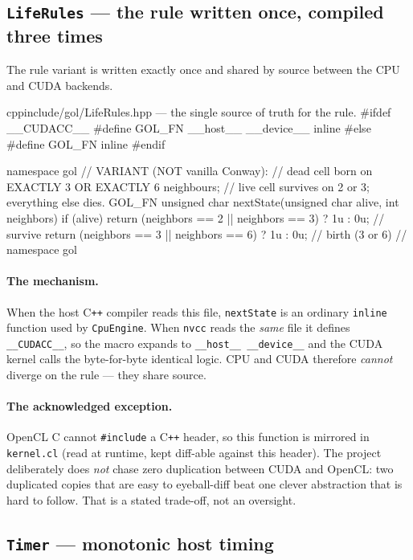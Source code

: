 \documentclass[
	english,
	letterpaper, oneside
]{article}
\begin{document}
\subsection{\texttt{LifeRules} --- the rule written once, compiled three times}
\label{sec:liferules}

The rule variant is written exactly once and shared by source between the CPU
and CUDA backends.

\begin{sourcecode}{cpp}{include/gol/LifeRules.hpp --- the single source of truth for the rule.}
#ifdef __CUDACC__
#define GOL_FN __host__ __device__ inline
#else
#define GOL_FN inline
#endif

namespace gol {
// VARIANT (NOT vanilla Conway):
//   dead cell born on EXACTLY 3 OR EXACTLY 6 neighbours;
//   live cell survives on 2 or 3; everything else dies.
GOL_FN unsigned char nextState(unsigned char alive, int neighbors) {
  if (alive) {
    return (neighbors == 2 || neighbors == 3) ? 1u : 0u; // survive
  }
  return (neighbors == 3 || neighbors == 6) ? 1u : 0u;   // birth (3 or 6)
}
} // namespace gol
\end{sourcecode}

\paragraph{The mechanism.} When the host C\texttt{++} compiler reads this file,
\texttt{nextState} is an ordinary \texttt{inline} function used by
\texttt{CpuEngine}. When \texttt{nvcc} reads the \emph{same} file it defines
\texttt{\_\_CUDACC\_\_}, so the macro expands to \texttt{\_\_host\_\_
\_\_device\_\_} and the CUDA kernel calls the byte-for-byte identical logic. CPU
and CUDA therefore \emph{cannot} diverge on the rule --- they share source.

\paragraph{The acknowledged exception.} OpenCL C cannot \texttt{\#include} a
C\texttt{++} header, so this function is mirrored in \texttt{kernel.cl}
(read at runtime, kept diff-able against this header). The project deliberately
does \emph{not} chase zero duplication between CUDA and OpenCL: two duplicated
copies that are easy to eyeball-diff beat one clever abstraction that is hard to
follow. That is a stated trade-off, not an oversight.

\subsection{\texttt{Timer} --- monotonic host timing}
\label{sec:timer}
\end{document}
